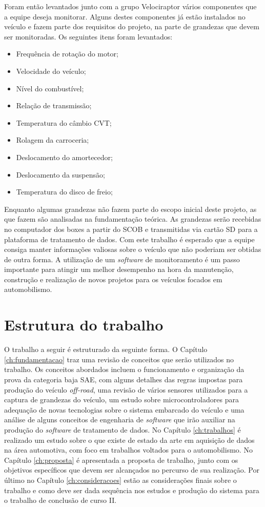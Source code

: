 Foram então levantados junto com a grupo Velociraptor vários componentes que a equipe deseja monitorar. Alguns destes componentes já estão instalados no veículo e fazem parte dos requisitos do projeto, na parte de grandezas que devem ser monitoradas. Os seguintes itens foram levantados: 

\begin{itemize}
	\item Frequência de rotação do motor;
	\item Velocidade do veículo;
	\item Nível do combustível;
	\item Relação de transmissão;
	\item Temperatura do câmbio CVT;
	\item Rolagem da carroceria;
	\item Deslocamento do amortecedor;
	\item Deslocamento da suspensão;
	\item Temperatura do disco de freio;
\end{itemize}

Enquanto algumas grandezas não fazem parte do escopo inicial deste projeto, as que fazem são analisadas na fundamentação teórica. As grandezas serão recebidas no computador dos boxes a partir do SCOB e transmitidas via cartão SD para a plataforma de tratamento de dados. Com este trabalho é esperado que a equipe consiga manter informações valiosas sobre o veículo que não poderiam ser obtidas de outra forma. A utilização de um \textit{software} de monitoramento é um passo importante para atingir um melhor desempenho na hora da manutenção, construção e realização de novos projetos para os veículos focados em automobilismo.   

\section{Estrutura do trabalho}

O trabalho a seguir é estruturado da seguinte forma. O Capítulo \ref{ch:fundamentacao} traz uma revisão de conceitos que serão utilizados no trabalho. Os conceitos abordados incluem o funcionamento e organização da prova da categoria baja SAE, com alguns detalhes das regras impostas para produção do veículo \textit{off-road}, uma revisão de vários sensores utilizados para a captura de grandezas do veículo, um estudo sobre microcontroladores para adequação de novas tecnologias sobre o sistema embarcado do veículo e uma análise de alguns conceitos de engenharia de \textit{software} que irão auxiliar na produção do \textit{software} de tratamento de dados. No Capítulo \ref{ch:trabalhos} é realizado um estudo sobre o que existe de estado da arte em aquisição de dados na área automotiva, com foco em trabalhos voltados para o automobilismo. No Capítulo \ref{ch:proposta} é apresentada a proposta de trabalho, junto com os objetivos específicos que devem ser alcançados no percurso de sua realização. Por último no Capítulo \ref{ch:consideracoes} estão as considerações finais sobre o trabalho e como deve ser dada sequência nos estudos e produção do sistema para o trabalho de conclusão de curso II.  
